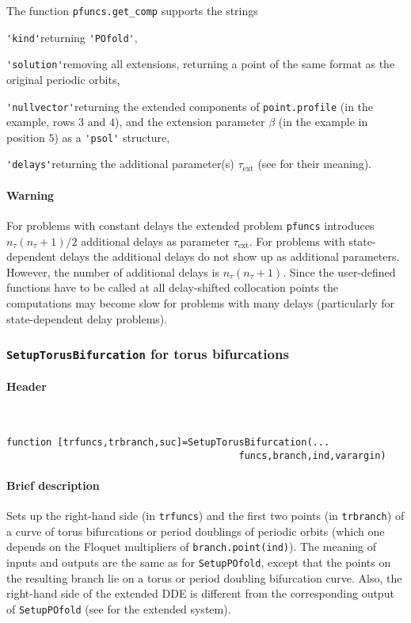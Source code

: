 \documentclass[11pt]{scrartcl}
\newcommand{\mt}[1]{\mathrm{#1}}
\newcommand{\mlvar}[1]{\lstinline[keywordstyle=\color{var}]!#1!}
\newcommand{\blist}[1]{\mbox{\lstinline!#1!}}  \newlength{\tabw}
\begin{document}
The function \blist{pfuncs.get_comp} supports the strings
\begin{compactitem}
\item  \blist{'kind'}\quad returning \blist{'POfold'},
\item \blist{'solution'}\quad removing all extensions, returning a
  point of the same format as the original periodic orbits,
\item \blist{'nullvector'}\quad returning the extended components of
  \blist{point.profile} (in the example, rows $3$ and $4$), and the
  extension parameter $\beta$ (in the example in position $5$) as a
  \blist{'psol'} structure,
\item \blist{'delays'}\quad returning the additional parameter(s)
  $\tau_\mathrm{ext}$ (see \cite{S13} for their meaning).
\end{compactitem}
\paragraph{Warning}
For problems with constant delays the extended problem \mlvar{pfuncs}
introduces $n_\tau(n_\tau+1)/2$ additional delays as parameter
$\tau_\mt{ext}$. For problems with state-dependent delays the
additional delays do not show up as additional parameters. However,
the number of additional delays is $n_\tau(n_\tau+1)$. Since the
user-defined functions have to be called at all delay-shifted
collocation points the computations may become slow for problems with
many delays (particularly for state-dependent delay problems).

\subsubsection{\blist{SetupTorusBifurcation} for torus bifurcations}
\label{sec:torusbif}

\paragraph{Header}\
\begin{lstlisting}
function [trfuncs,trbranch,suc]=SetupTorusBifurcation(...
                                         funcs,branch,ind,varargin)
\end{lstlisting}

\paragraph{Brief description}
Sets up the right-hand side (in \blist{trfuncs}) and the first two
points (in \blist{trbranch}) of a curve of torus bifurcations or
period doublings of periodic orbits (which one depends on the Floquet
multipliers of \blist{branch.point(ind)}). The meaning of inputs and
outputs are the same as for \blist{SetupPOfold}, except that the
points on the resulting branch lie on a torus or period doubling
bifurcation curve. Also, the right-hand side of the extended DDE is
different from the corresponding output of \blist{SetupPOfold} (see
\cite{S13} for the extended system).
\end{document}
